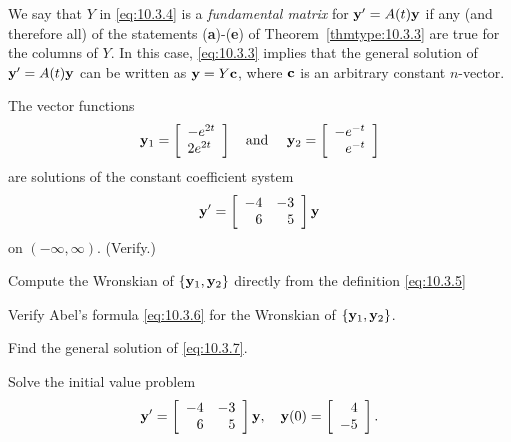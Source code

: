 We say that $Y$ in \eqref{eq:10.3.4} is a {\color{blue}\it fundamental matrix\/} for
${\bf y}'=A(t){\bf y}$ if any (and therefore all) of the statements ({\bf a})-({\bf e}) of
Theorem~\ref{thmtype:10.3.3} are true for the columns of $Y$. In this case, \eqref{eq:10.3.3}
implies that the general solution of ${\bf y}'=A(t){\bf y}$ can be written as ${\bf y}=Y{\bf c}$,
where ${\bf c}$ is an arbitrary constant $n$-vector.

\begin{example}
  \label{example:10.3.2} \rm The vector functions
  \[
    {\bf y}_{1}=\left[\begin{array}{l}-e^{2t}\\2e^{2t}\end{array}\right]\mbox{\quad and \quad}{\bf y}_{2}=\left[\begin{array}{l}-e^{-t}\\\phantom{-}e^{-t}\end{array}\right]
  \]
  are solutions of the constant coefficient system
  \begin{equation}
    \label{eq:10.3.7}{\bf y}'=\left[\begin{array}{rr} -4&-3\\6&5\end{array}\right]{\bf y}
  \end{equation}
  on $(-\infty,\infty)$. (Verify.)
  \begin{alist}
    \item %
    Compute the Wronskian of $\{{\bf y}_{1},{\bf y}_{2}\}$ directly from the definition
    \eqref{eq:10.3.5}

    \item %
    Verify Abel's formula \eqref{eq:10.3.6} for the Wronskian of $\{{\bf y}_{1},{\bf y}_{2}\}$.

    \item %
    Find the general solution of \eqref{eq:10.3.7}.

    \item %
    Solve the initial value problem
    \begin{equation}
      \label{eq:10.3.8}{\bf y}'=\left[\begin{array}{rr} -4&-3\\6&5\end{array}\right]{\bf y},\quad{\bf y}(0)= \left[
      \begin{array}{r}
        4  \\
        -5
      \end{array}\right].
    \end{equation}
  \end{alist}
\end{example}

